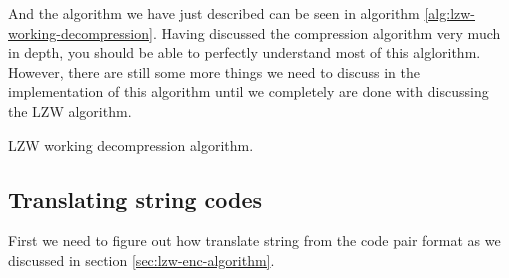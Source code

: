 And the algorithm we have just described can be seen in algorithm
\ref{alg:lzw-working-decompression}. Having discussed the compression
algorithm very much in depth, you should be able to perfectly
understand most of this alglorithm. However, there are still some more
things we need to discuss in the implementation of this algorithm
until we completely are done with discussing the LZW algorithm.

\begin{algorithm}[H]
  \caption{LZW working decompression algorithm.}
  \label{alg:lzw-working-decompression}
  \begin{algorithmic}[1]

    \State {}

    \State {}




       
      \Else
      \EndIf

      \State {}

       

        \State {}

      \EndIf



    \EndWhile
  \end{algorithmic}
\end{algorithm}

\subsection{Translating string codes}

First we need to figure out how translate string from the code pair format as we
discussed in section \ref{sec:lzw-enc-algorithm}.

